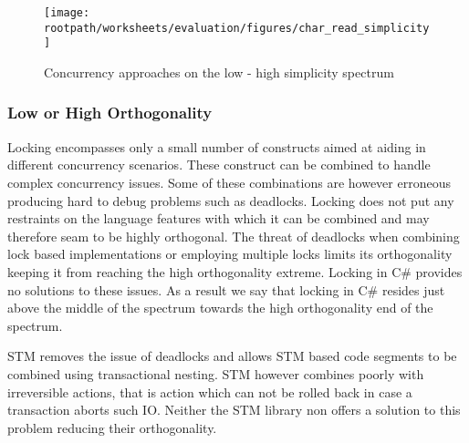 \begin{figure}[htbp]
\centering
 \texttt{[image: \\rootpath/worksheets/evaluation/figures/char\_read\_simplicity]} 
 \caption{Concurrency approaches on the low - high simplicity spectrum}
\label{fig:char_simplicity}
\end{figure}
\subsubsection{Low or High Orthogonality}\label{subsec:orthogonality}
Locking encompasses only a small number of constructs aimed at aiding in different concurrency scenarios. These construct can be combined to handle complex concurrency issues. Some of these combinations are however erroneous producing hard to debug problems such as deadlocks. Locking does not put any restraints on the language features with which it can be combined and may therefore seam to be highly orthogonal. The threat  of deadlocks when combining lock based implementations or employing multiple locks limits its orthogonality keeping it from reaching the high orthogonality extreme. Locking in C\# provides no solutions to these issues. As a result we say that locking in C\# resides just above the middle of the spectrum towards the high orthogonality end of the spectrum.

\ac{STM} removes the issue of deadlocks and allows \ac{STM} based code segments to be combined using transactional nesting. \ac{STM} however combines poorly with irreversible actions, that is action which can not be rolled back in case a transaction aborts such \ac{IO}. Neither the \ac{STM} library non \stmnamesp offers a solution to this problem reducing their orthogonality. 

